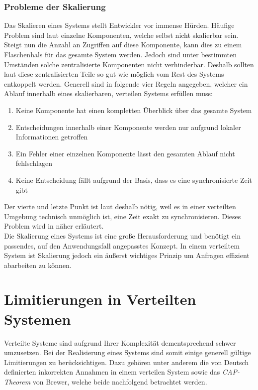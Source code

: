 \subsubsection{Probleme der Skalierung}
Das Skalieren eines Systems stellt Entwickler vor immense Hürden. Häufige Problem sind laut \cite{tanenbaum2007distributed} einzelne Komponenten, welche selbst nicht skalierbar sein. Steigt nun die Anzahl an Zugriffen auf diese Komponente, kann dies zu einem Flaschenhals für das gesamte System werden. Jedoch sind unter bestimmten Umständen solche zentralisierte Komponenten nicht verhinderbar. Deshalb sollten laut \cite{tanenbaum2007distributed} diese zentralisierten Teile so gut wie möglich vom Rest des Systems entkoppelt werden. Generell sind in \cite{tanenbaum2007distributed} folgende vier Regeln angegeben, welcher ein Ablauf innerhalb eines skalierbaren, verteilen Systems erfüllen muss:
\begin{enumerate}
    \item Keine Komponente hat einen kompletten Überblick über das gesamte System
    \item Entscheidungen innerhalb einer Komponente werden nur aufgrund lokaler Informationen getroffen
    \item Ein Fehler einer einzelnen Komponente lässt den gesamten Ablauf nicht fehlschlagen
    \item Keine Entscheidung fällt aufgrund der Basis, dass es eine synchronisierte Zeit gibt
% 
% 
\end{enumerate}
Der vierte und letzte Punkt ist laut \cite{tanenbaum2007distributed} deshalb nötig, weil es in einer verteilten Umgebung technisch unmöglich ist, eine Zeit exakt zu synchronisieren. Dieses Problem wird in \cite{lamport1978time} näher erläutert.\\
Die Skalierung eines Systems ist eine große Herausforderung und benötigt ein passendes, auf den Anwendungsfall angepasstes Konzept. In einem verteiltem System ist Skalierung jedoch ein äußerst wichtiges Prinzip um Anfragen effizient abarbeiten zu können.\cite{tanenbaum2007distributed}
 
\section{Limitierungen in Verteilten Systemen}
Verteilte Systeme sind aufgrund Ihrer Komplexität dementsprechend schwer umzusetzen. Bei der Realisierung eines Systems sind somit einige generell gültige Limitierungen zu berücksichtigen. Dazu gehören unter anderem die von Deutsch definierten inkorrekten Annahmen in einem verteilen System sowie das \textit{CAP-Theorem} von Brewer, welche beide nachfolgend betrachtet werden.
% 
% 
% 

